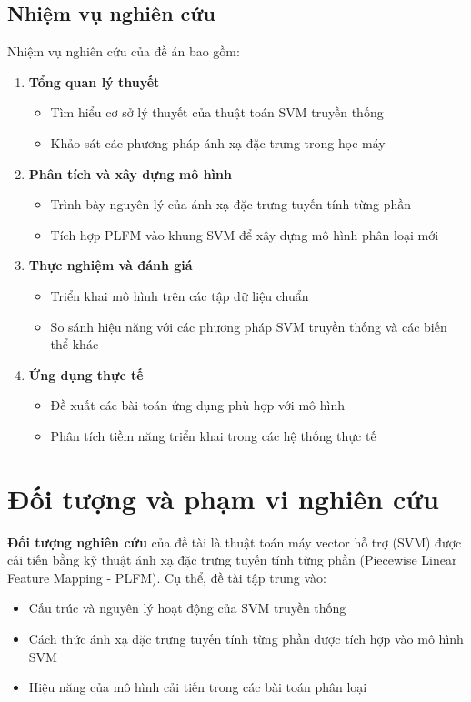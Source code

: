 \subsection*{Nhiệm vụ nghiên cứu}
Nhiệm vụ nghiên cứu của đề án bao gồm:
\begin{enumerate}
\item \textbf{Tổng quan lý thuyết}
\begin{itemize}
    \item Tìm hiểu cơ sở lý thuyết của thuật toán SVM truyền thống
    \item Khảo sát các phương pháp ánh xạ đặc trưng trong học máy
\end{itemize}
\item \textbf{Phân tích và xây dựng mô hình}
\begin{itemize}
    \item Trình bày nguyên lý của ánh xạ đặc trưng tuyến tính từng phần
    \item Tích hợp PLFM vào khung SVM để xây dựng mô hình phân loại mới
\end{itemize}
\item \textbf{Thực nghiệm và đánh giá}
\begin{itemize}
    \item Triển khai mô hình trên các tập dữ liệu chuẩn
    \item So sánh hiệu năng với các phương pháp SVM truyền thống và các biến thể khác
\end{itemize}
\item \textbf{Ứng dụng thực tế}
\begin{itemize}
    \item Đề xuất các bài toán ứng dụng phù hợp với mô hình
    \item Phân tích tiềm năng triển khai trong các hệ thống thực tế
\end{itemize}
\end{enumerate}

\section*{Đối tượng và phạm vi nghiên cứu}
\textbf{Đối tượng nghiên cứu} của đề tài là thuật toán máy vector hỗ trợ (SVM) được cải tiến bằng kỹ thuật ánh xạ đặc trưng tuyến tính từng phần (Piecewise Linear Feature Mapping - PLFM). Cụ thể, đề tài tập trung vào:
\begin{itemize}
\item Cấu trúc và nguyên lý hoạt động của SVM truyền thống
\item Cách thức ánh xạ đặc trưng tuyến tính từng phần được tích hợp vào mô hình SVM
\item Hiệu năng của mô hình cải tiến trong các bài toán phân loại
\end{itemize}

